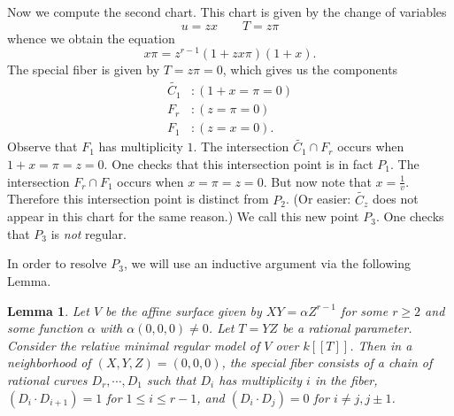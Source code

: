 \documentclass{article}
\theoremstyle{plain}
\newtheorem{lemma}[theorem]{Lemma}
\theoremstyle{definition}
\theoremstyle{remark}
\renewcommand{\tilde}[1]{\widetilde{#1}}
\begin{document}
Now we compute the second chart. This chart is given by the change of variables
\[
u=zx \qquad T=z\pi
\]
whence we obtain the equation
\[
x\pi = z^{r-1}(1 + zx\pi)(1 + x).
\]
The special fiber is given by $T = z\pi = 0$, which gives us the components
\begin{align*}
  \tilde{C_1}&: (1 + x = \pi = 0) \\
  F_r&: (z = \pi = 0) \\
  F_1&: (z = x = 0).
\end{align*}
Observe that $F_1$ has multiplicity $1$. The intersection $\tilde{C_1} \cap F_r$ occurs when $1 + x = \pi = z = 0$. One checks that this intersection point is in fact $P_1$. The intersection $F_r \cap F_1$ occurs when $x = \pi = z = 0$. But now note that $x = \frac{1}{v}$. Therefore this intersection point is distinct from $P_2$. (Or easier: $\tilde{C_z}$ does not appear in this chart for the same reason.) We call this new point $P_3$. One checks that $P_3$ is \emph{not} regular.

In order to resolve $P_3$, we will use an inductive argument via the following Lemma.

\begin{lemma}
  Let $V$ be the affine surface given by $XY = \alpha Z^{r-1}$ for some $r \geq 2$ and some function $\alpha$ with $\alpha(0,0,0) \neq 0$. Let $T = YZ$ be a rational parameter. Consider the relative minimal regular model of $V$ over $k[[T]]$. Then in a neighborhood of $(X,Y,Z) = (0,0,0)$, the special fiber consists of a chain of rational curves $D_r, \cdots, D_1$ such that $D_i$ has multiplicity $i$ in the fiber, $(D_i \cdot D_{i+1}) = 1$ for $1 \leq i \leq r-1$, and $(D_i \cdot D_j) = 0$ for $i \neq j, j \pm 1$.
\end{lemma}
\end{document}
